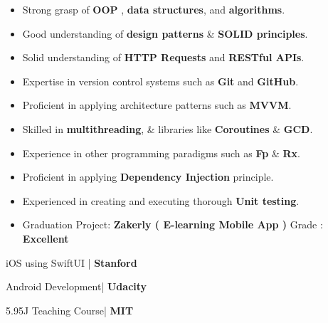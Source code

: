 \documentclass[10pt,a4paper,ragged2e,withhyper]{altacv}
\begin{document}
\begin{paracol}{2}
        {\large\begin{itemize}
                   \item Strong grasp of \textbf{OOP} , \textbf{data structures}, and \textbf{algorithms}.
                   \item Good understanding of \textbf{design patterns} \& \textbf{SOLID principles}.
                   \item Solid understanding of \textbf{HTTP Requests} and \textbf{RESTful APIs}.
                   \item Expertise in version control systems such as \textbf{Git} and \textbf{GitHub}.
                   \item Proficient in applying architecture patterns such as \textbf{MVVM}.
                   \item Skilled in \textbf{multithreading}, \& libraries like \textbf{Coroutines} \& \textbf{GCD}.
                   \item Experience in other programming paradigms such as \textbf{Fp} \& \textbf{Rx}.
                   \item Proficient in applying \textbf{Dependency Injection} principle.
                   \item Experienced in creating and executing thorough \textbf{Unit testing}.
        \end{itemize}}

        \begin{itemize}
            \item Graduation Project: \textbf{Zakerly ( E-learning Mobile App )} Grade : \textbf{Excellent}
        \end{itemize}




        \begin{multicols}{2}
            \cvevent
            {\faSwift  iOS using SwiftUI} {| \textbf{Stanford}}{}{}
            \divider


            \cvevent
            {\faAndroid Android Development}{| \textbf{Udacity}}{}{}
            \divider

            \cvevent
            {\faEdit 5.95J Teaching Course}{| \textbf{MIT}}{}{}


            \columnbreak

        \end{multicols}

    \end{paracol}
\end{document}
